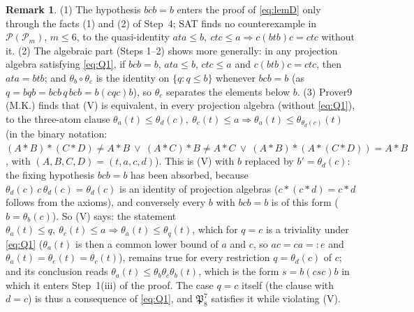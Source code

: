 \documentclass[11pt]{amsart}
\theoremstyle{definition}
\newtheorem{remark}[theorem]{Remark}
\renewcommand{\P}{\mathcal{P}}
\begin{document}
\begin{remark}\label{rem:V}
(1) The hypothesis $bcb=b$ enters the proof of \eqref{eq:lemD} only through the facts (1) and (2) of Step~4; SAT finds no counterexample in $\P(\P_m)$, $m\le6$, to the quasi-identity $ata\le b,\ ctc\le a\Rightarrow c(btb)c=ctc$ without it. (2) The algebraic part (Steps 1--2) shows more generally: in any projection algebra satisfying \eqref{eq:Q1}, if $bcb=b$, $ata\le b$, $ctc\le a$ and $c(btb)c=ctc$, then $ata=btb$; and $\theta_b\circ\theta_c$ is the identity on $\{q:q\le b\}$ whenever $bcb=b$ (as $q=bqb=bcb\,q\,bcb=b(cqc)b$), so $\theta_c$ separates the elements below $b$.
 (3) Prover9 (M.K.) finds that (V) is equivalent, in every projection algebra (without \eqref{eq:Q1}), to the three-atom clause $\theta_a(t)\le\theta_d(c),\ \theta_c(t)\le a\Rightarrow\theta_a(t)\le\theta_{\theta_d(c)}(t)$ (in the binary notation: $(A*B)*(C*D)\ne A*B\ \vee\ (A*C)*B\ne A*C\ \vee\ (A*B)*(A*(C*D))=A*B$, with $(A,B,C,D)=(t,a,c,d)$). This is (V) with $b$ replaced by $b'=\theta_d(c)$: the fixing hypothesis $bcb=b$ has been absorbed, because $\theta_d(c)\,c\,\theta_d(c)=\theta_d(c)$ is an identity of projection algebras ($c*(c*d)=c*d$ follows from the axioms), and conversely every $b$ with $bcb=b$ is of this form ($b=\theta_b(c)$). So (V) says: the statement $\theta_a(t)\le q,\ \theta_c(t)\le a\Rightarrow\theta_a(t)\le\theta_q(t)$, which for $q=c$ is a triviality under \eqref{eq:Q1} ($\theta_a(t)$ is then a common lower bound of $a$ and $c$, so $ac=ca=:e$ and $\theta_a(t)=\theta_e(t)=\theta_c(t)$), remains true for every restriction $q=\theta_d(c)$ of $c$; and its conclusion reads $\theta_a(t)\le\theta_b\theta_c\theta_b(t)$, which is the form $s=b(csc)b$ in which it enters Step~1(iii) of the proof. The case $q=c$ itself (the clause with $d=c$) is thus a consequence of \eqref{eq:Q1}, and $\mathfrak P_8^7$ satisfies it while violating (V).
\end{remark}
\end{document}
